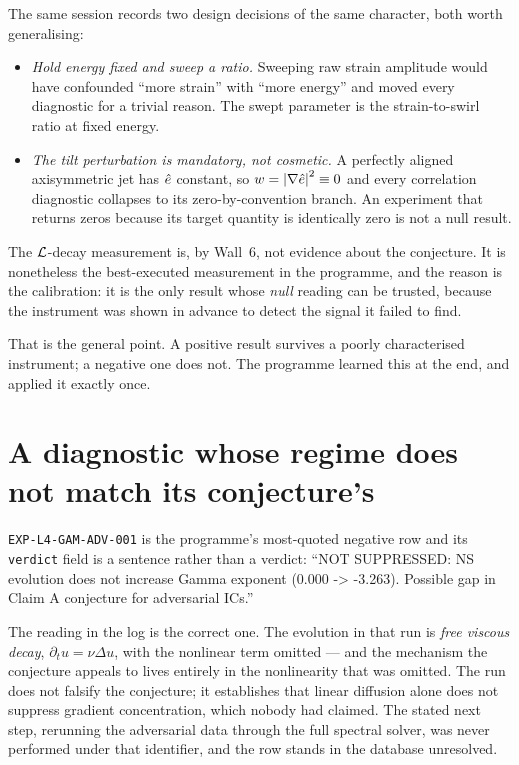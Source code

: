 The same session records two design decisions of the same character, both
worth generalising:

\begin{itemize}[leftmargin=1.6em]
\item \emph{Hold energy fixed and sweep a ratio.} Sweeping raw strain
  amplitude would have confounded ``more strain'' with ``more energy'' and
  moved every diagnostic for a trivial reason. The swept parameter is the
  strain-to-swirl ratio at fixed energy.
\item \emph{The tilt perturbation is mandatory, not cosmetic.} A perfectly
  aligned axisymmetric jet has \(\hat{e}\) constant, so \(w=\left|\nabla\hat{e}\right|^2\equiv0\)
  and every correlation diagnostic collapses to its zero-by-convention branch.
  An experiment that returns zeros because its target quantity is identically
  zero is not a null result.
\end{itemize}

\begin{obsv}
\label{obs:calibration-value}
The \(\mathcal{L}\)-decay measurement is, by Wall~6, not evidence about the
conjecture. It is nonetheless the best-executed measurement in the programme,
and the reason is the calibration: it is the only result whose \emph{null}
reading can be trusted, because the instrument was shown in advance to detect
the signal it failed to find.

\smallskip
That is the general point. A positive result survives a poorly characterised
instrument; a negative one does not. The programme learned this at the end,
and applied it exactly once.
\end{obsv}

\section{A diagnostic whose regime does not match its conjecture's}
\label{sec:gamma}

\texttt{EXP-L4-GAM-ADV-001} is the programme's most-quoted negative row and
its \texttt{verdict} field is a sentence rather than a verdict:
``\textsf{NOT SUPPRESSED: NS evolution does not increase Gamma exponent
(0.000 -> -3.263). Possible gap in Claim A conjecture for adversarial ICs.}''

The reading in the  log is the correct one. The evolution in that run
is \emph{free viscous decay}, \(\partial_tu=\nu\Delta u\), with the nonlinear
term omitted --- and the mechanism the conjecture appeals to lives entirely in
the nonlinearity that was omitted. The run does not falsify the conjecture; it
establishes that linear diffusion alone does not suppress gradient
concentration, which nobody had claimed. The stated next step, rerunning the
adversarial data through the full spectral solver, was never performed under
that identifier, and the row stands in the database unresolved.

